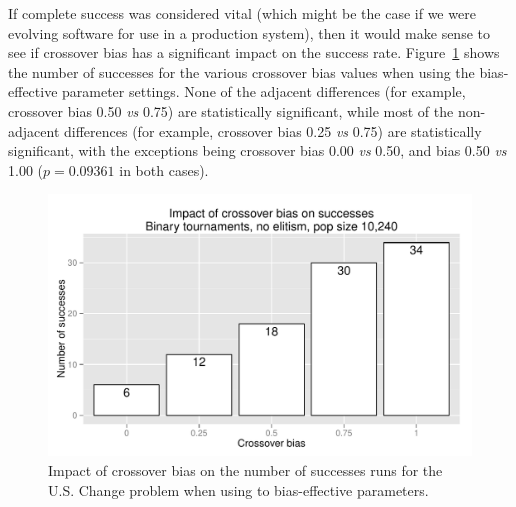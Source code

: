 \documentclass{sig-alternate}
\begin{document}
%
%
%
%

If complete success was considered vital (which might be the case if we were evolving software for use in a production
system), then it would make sense to see if crossover bias has a significant impact on the success rate.
Figure~\ref{fig:USChange_Successes_strong} shows the number of successes for the various crossover bias values when
using the bias-effective parameter settings. None of the adjacent differences (for example, crossover bias 0.50 \emph{vs} 0.75)
are statistically significant, while most of the non-adjacent differences (for example, crossover bias 0.25 \emph{vs} 0.75)
are statistically significant, with the exceptions being crossover bias 0.00 \emph{vs} 0.50, and bias 0.50 \emph{vs} 1.00
($p=0.09361$ in both cases).

\begin{figure}
\centering
\includegraphics[width=0.45 \textwidth]{Plots/US_change_successes_strong.pdf}
\caption{Impact of crossover bias on the number of successes runs for the U.S. Change problem when using to bias-effective parameters.}
\label{fig:USChange_Successes_strong}
\end{figure}

%
%
%
%

\end{document}
